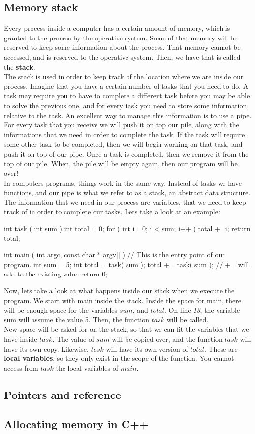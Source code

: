 \documentclass[../notebook.tex]{subfiles}
\begin{document}
\subsection{ Memory stack } %
\label{sub:subsection name}
Every process inside a computer has a certain amount of memory, which is granted to the process by the operative system. Some of that memory will be reserved to keep some information about the process. That memory cannot be accessed, and is reserved to the operative system.  Then, we have that is called the {\bf stack}.\\
The stack is used in order to keep track of the location where we are inside our process. Imagine that you have a certain number of tasks that you need to do. A task may require you to have to complete a different task before you may be able to solve the previous one, and for every task you need to store some information, relative to the task. An excellent way to manage this information is to use a pipe. For every task that you receive we will push it on top our pile, along with the informations that we need in order to complete the task. If the task will require some other task to be completed, then we will begin working on that task, and push it on top of our pipe. Once a task is completed, then we remove it from the top of our pile. When, the pile will be empty again, then our program will be over! \\
In computers programs, things work in the same way. Instead of tasks we have functions, and our pipe is what we refer to as a stack, an abstract data structure. The information that we need in our process are variables, that we need to keep track of in order to complete our tasks. Lets take a look at an example:
\begin{cppcode}
  int task ( int sum )
  {
    int total = 0;
    for ( int i =0; i < sum; i++ )
      total +=i; 
    return total;
  }

  int main ( int argc, const char * argv[] ) 
  { //  This is the entry point of our program.
    int sum = 5;
    int total = task( sum );
    total    += task( sum ); // += will add to the existing value
    return 0; 
  }
\end{cppcode}
Now, lets take a look at what happens inside our stack when we execute the program. We start with main inside the stack. Inside the space for main, there will be enough space for the variables $sum$, and $total$. On line \emph{13}, the variable sum will assume the value 5. Then, the function $task$ will be called. \\
New space will be asked for on the stack, so that we can fit the variables that we have inside $task$. The value of $sum$ will be copied over, and the function $task$ will have its own copy. Likewise, $task$ will have its own version of $total$. These are {\bf local variables}, so they only exist in the scope of the function. You cannot access from $task$ the local variables of $main$.
\subsection{Pointers and reference} %
\label{sub:Pointers and reference}

\subsection{ Allocating memory in C++ } %
\label{sub: Allocating memory in C++ }

\end{document}
